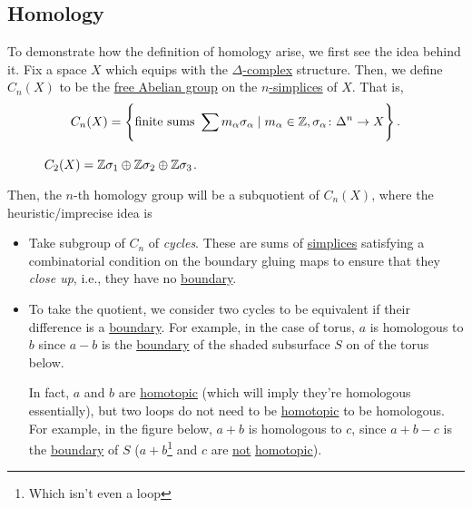\subsection{Homology}
To demonstrate how the definition of homology arise, we first see the idea behind it. Fix a space \(X\) which equips with the \hyperref[def:delta-complex]{\(\Delta\)-complex}
structure. Then, we define \(C_{n} (X)\) to be the \hyperref[def:free-Abelian-group]{free Abelian group} on the \hyperref[def:standard-simplex]{\(n\)-simplices} of \(X\). That is,
\[
	C_{n} (X) = \left\{\text{finite sums } \sum\limits_{}^{} m_\alpha \sigma _\alpha \mid m_\alpha \in \mathbb{\MakeUppercase{z}} , \sigma _\alpha \colon \Delta ^n\to X\right\}.
\]
\begin{figure}[H]
	\centering
	\caption{\(C_2(X) = \mathbb{\MakeUppercase{z}} \sigma _1 \oplus \mathbb{\MakeUppercase{z}} \sigma _2\oplus \mathbb{\MakeUppercase{z}} \sigma _3\).}
	\label{fig:C2-lec21}
\end{figure}
Then, the \(n\)-th homology group will be a subquotient of \(C_{n} (X)\), where the heuristic/imprecise idea is
\begin{itemize}
	\item Take subgroup of \(C_{n}\) of \emph{cycles}. These are sums of \hyperref[def:standard-simplex]{simplices} satisfying a combinatorial condition
	      on the boundary gluing maps to ensure that they \emph{close up}, i.e., they have no \hyperref[def:boundary]{boundary}.
	      \begin{figure}[H]
		      \centering
		      \label{fig:lec21-demo-of-homology-group}
	      \end{figure}
	\item To take the quotient, we consider two cycles to be equivalent if their difference is a \hyperref[def:boundary]{boundary}. For example, in
	      the case of torus, \(a\) is homologous to \(b\) since \(a - b\) is the \hyperref[def:boundary]{boundary} of the shaded subsurface \(S\) on
	      of the torus below.
	      \begin{figure}[H]
		      \centering
		      \label{fig:lec21-torus}
	      \end{figure}
	      In fact, \(a\) and \(b\) are \hyperref[def:homotopic]{homotopic} (which will imply they're homologous essentially), but two loops do not
	      need to be \hyperref[def:homotopic]{homotopic} to be homologous. For example, in the figure below, \(a+b\) is homologous to \(c\), since
	      \(a+b-c\) is the \hyperref[def:boundary]{boundary} of \(S\) (\(a+b\)\footnote{Which isn't even a loop} and \(c\) are \underline{not} \hyperref[def:homotopic]{homotopic}).
	      \begin{figure}[H]
		      \centering
		      \label{fig:lec21-3-torus}
	      \end{figure}
\end{itemize}

